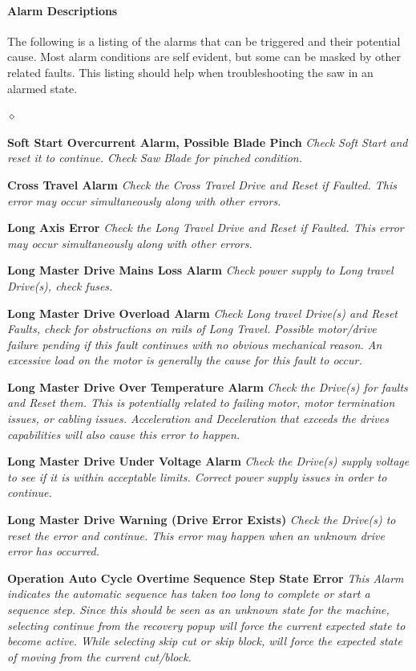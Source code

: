 \paragraph*{Alarm Descriptions}
The following is a listing of the alarms that can be triggered and their potential cause. Most alarm conditions are self evident, but some can be masked by other related faults. This listing should help when troubleshooting the saw in an alarmed state.
\begin{list}{$\diamond$}{}
	\item \textbf{Soft Start Overcurrent Alarm, Possible Blade Pinch} \textit{Check Soft Start and reset it to continue. Check Saw Blade for pinched condition.}
	\item \textbf{Cross Travel Alarm} \textit{Check the Cross Travel Drive and Reset if Faulted. This error may occur simultaneously along with other errors.}
	\item \textbf{Long Axis Error} \textit{Check the Long Travel Drive and Reset if Faulted. This error may occur simultaneously along with other errors.}
	\item \textbf{Long Master Drive Mains Loss Alarm} \textit{Check power supply to Long travel Drive(s), check fuses.}
	\item \textbf{Long Master Drive Overload Alarm} \textit{Check Long travel Drive(s) and Reset Faults, check for obstructions on rails of Long Travel. Possible motor/drive failure pending if this fault continues with no obvious mechanical reason. An excessive load on the motor is generally the cause for this fault to occur.}
	\item \textbf{Long Master Drive Over Temperature Alarm} \textit{Check the Drive(s) for faults and Reset them. This is potentially related to failing motor, motor termination issues, or cabling issues. Acceleration and Deceleration that exceeds the drives capabilities will also cause this error to happen.}
	\item \textbf{Long Master Drive Under Voltage Alarm} \textit{Check the Drive(s) supply voltage to see if it is within acceptable limits. Correct power supply issues in  order to continue.}
	\item \textbf{Long Master Drive Warning (Drive Error Exists)} \textit{Check the Drive(s) to reset the error and continue. This error may happen when an unknown drive error has occurred.}
	\item \textbf{Operation Auto Cycle Overtime Sequence Step State Error} \textit{This Alarm indicates the automatic sequence has taken too long to complete or start a sequence step. Since this should be seen as an unknown state for the machine, selecting continue from the recovery popup will force the current expected state to become active. While selecting skip cut or skip block, will force the expected state of moving from the current cut/block.}

\end{list}
